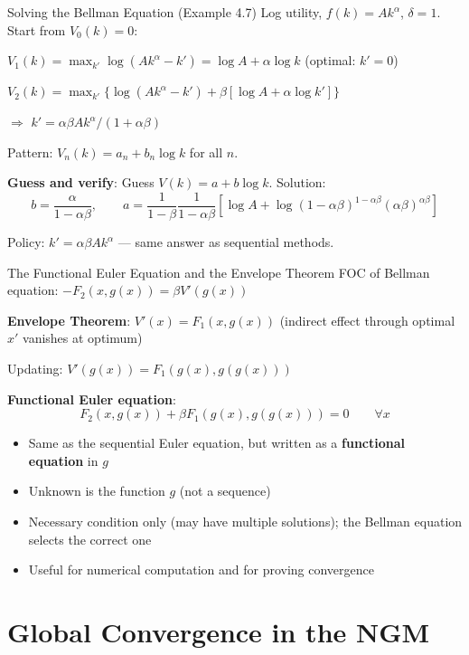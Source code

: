 \documentclass[blue]{beamer}
\begin{document}
\begin{frame}{Solving the Bellman Equation (Example 4.7)}
	Log utility, $f(k) = Ak^\alpha$, $\delta = 1$. Start from $V_0(k) = 0$:
	
	\medskip
	$V_1(k) = \max_{k'} \log(Ak^\alpha - k') = \log A + \alpha\log k$ (optimal: $k' = 0$)
	
	\medskip
	$V_2(k) = \max_{k'} \{\log(Ak^\alpha - k') + \beta[\log A + \alpha\log k']\}$
	
	$\Rightarrow$ $k' = \alpha\beta Ak^\alpha/(1+\alpha\beta)$
	
	\bigskip
	Pattern: $V_n(k) = a_n + b_n\log k$ for all $n$.
	
	\bigskip
	\textbf{Guess and verify}: Guess $V(k) = a + b\log k$. Solution:
	\[
	b = \frac{\alpha}{1-\alpha\beta}, \qquad a = \frac{1}{1-\beta}\frac{1}{1-\alpha\beta}\left[\log A + \log(1-\alpha\beta)^{1-\alpha\beta}(\alpha\beta)^{\alpha\beta}\right]
	\]
	
	Policy: $k' = \alpha\beta Ak^\alpha$ --- same answer as sequential methods.
\end{frame}
\begin{frame}{The Functional Euler Equation and the Envelope Theorem}
	FOC of Bellman equation: $-F_2(x, g(x)) = \beta V'(g(x))$

	\textbf{Envelope Theorem}: $V'(x) = F_1(x, g(x))$ (indirect effect through optimal $x'$ vanishes at optimum)
	
	Updating: $V'(g(x)) = F_1(g(x), g(g(x)))$

	\textbf{Functional Euler equation}:
	\[
	F_2(x, g(x)) + \beta F_1(g(x), g(g(x))) = 0 \qquad \forall x
	\]
	
	\begin{itemize}
		\item Same as the sequential Euler equation, but written as a \textbf{functional equation} in $g$
		\item Unknown is the function $g$ (not a sequence)
		\item Necessary condition only (may have multiple solutions); the Bellman equation selects the correct one
		\item Useful for numerical computation and for proving convergence
	\end{itemize}
\end{frame}

\section{Global Convergence in the NGM}
\end{document}
